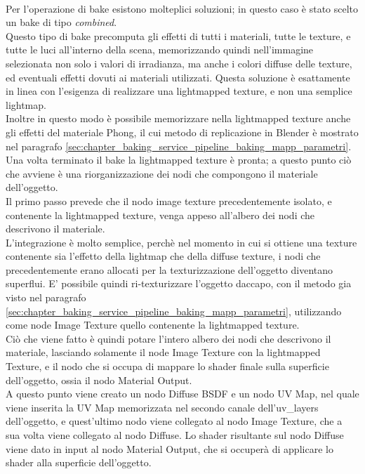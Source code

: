 \\
Per l’operazione di bake esistono molteplici soluzioni; in questo caso è stato scelto un bake di tipo \emph{combined}. 
\\
Questo tipo di bake precomputa gli effetti di tutti i materiali, tutte le texture, e tutte le luci all’interno della scena, memorizzando quindi nell’immagine selezionata non solo i valori di irradianza, ma anche i colori diffuse delle texture, ed eventuali effetti dovuti ai materiali utilizzati. Questa soluzione è esattamente in linea con l’esigenza di realizzare una lightmapped texture, e non una semplice lightmap. 
\\
Inoltre in questo modo è possibile memorizzare nella lightmapped texture anche gli effetti del materiale Phong, il cui metodo di replicazione in Blender è mostrato nel paragrafo \ref{sec:chapter_baking_service_pipeline_baking_mapp_parametri}. 
\\
Una volta terminato il bake la lightmapped texture è pronta; a questo punto ciò che avviene è una riorganizzazione dei nodi che compongono il materiale dell’oggetto.
\\ 
Il primo passo prevede che il nodo image texture precedentemente isolato, e contenente la lightmapped texture, venga appeso all’albero dei nodi che descrivono il materiale. 
\\
L’integrazione è molto semplice, perchè nel momento in cui si ottiene una texture contenente sia l’effetto della lightmap che della diffuse texture, i nodi che precedentemente erano allocati per la texturizzazione dell’oggetto diventano superflui. E’ possibile quindi ri-texturizzare l’oggetto daccapo, con il metodo gia visto nel paragrafo \ref{sec:chapter_baking_service_pipeline_baking_mapp_parametri}, utilizzando come node Image Texture quello contenente la lightmapped texture.
\\ 
Ciò che viene fatto è quindi potare l’intero albero dei nodi che descrivono il materiale, lasciando solamente il node Image Texture con la lightmapped Texture, e il nodo che si occupa di mappare lo shader finale sulla superficie dell’oggetto, ossia il nodo Material Output. 
\\
A questo punto viene creato un nodo Diffuse BSDF e un nodo UV Map, nel quale viene inserita la UV Map memorizzata nel secondo canale dell’uv\_layers dell’oggetto, e quest’ultimo nodo viene collegato al nodo Image Texture, che a sua volta viene collegato al nodo Diffuse. Lo shader risultante sul nodo Diffuse viene dato in input al nodo Material Output, che si occuperà di applicare lo shader alla superficie dell’oggetto. 

